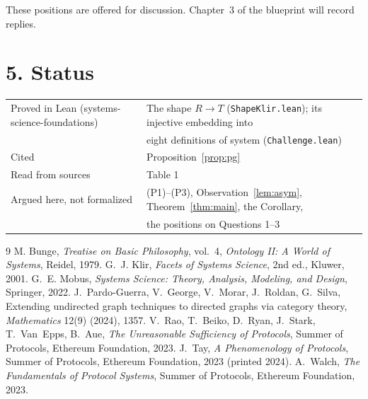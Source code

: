 \documentclass[10pt]{article}
\theoremstyle{definition}
\theoremstyle{remark}
\begin{document}
These positions are offered for discussion. Chapter~3 of the blueprint will record replies.

\section*{5. Status}

\begin{center}\small
\begin{tabular}{@{}ll@{}}
\toprule
Proved in Lean (systems-science-foundations) & The shape $R \to T$ (\texttt{ShapeKlir.lean}); its injective embedding into \\
 & eight definitions of system (\texttt{Challenge.lean}) \\
Cited & Proposition~\ref{prop:pg} \\
Read from sources & Table 1 \\
Argued here, not formalized & (P1)--(P3), Observation~\ref{lem:asym}, Theorem~\ref{thm:main}, the Corollary, \\
 & the positions on Questions 1--3 \\
\bottomrule
\end{tabular}
\end{center}

\begin{thebibliography}{9}\small\setlength{\itemsep}{0pt}
 M. Bunge, \emph{Treatise on Basic Philosophy}, vol.~4, \emph{Ontology II: A World of Systems}, Reidel, 1979.
 G.~J. Klir, \emph{Facets of Systems Science}, 2nd ed., Kluwer, 2001.
 G.~E. Mobus, \emph{Systems Science: Theory, Analysis, Modeling, and Design}, Springer, 2022.
 J.~Pardo-Guerra, V.~George, V.~Morar, J.~Roldan, G.~Silva, Extending undirected graph techniques to directed graphs via category theory, \emph{Mathematics} 12(9) (2024), 1357.
 V.~Rao, T.~Beiko, D.~Ryan, J.~Stark, T.~Van~Epps, B.~Aue, \emph{The Unreasonable Sufficiency of Protocols}, Summer of Protocols, Ethereum Foundation, 2023.
 J.~Tay, \emph{A Phenomenology of Protocols}, Summer of Protocols, Ethereum Foundation, 2023 (printed 2024).
 A.~Walch, \emph{The Fundamentals of Protocol Systems}, Summer of Protocols, Ethereum Foundation, 2023.
\end{thebibliography}
\end{document}
